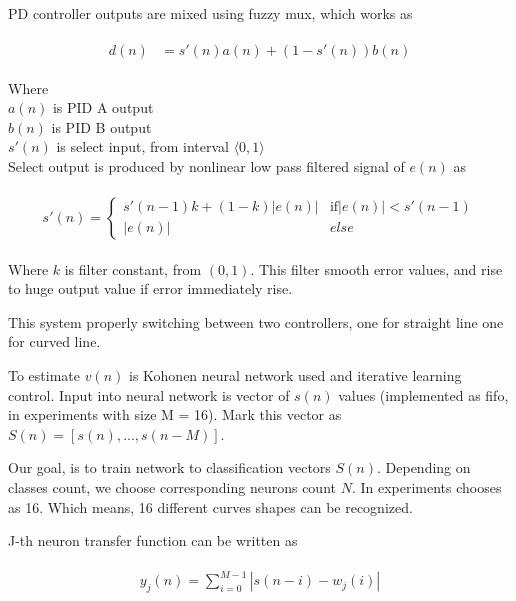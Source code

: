 \documentclass[twoside]{oss-conf-eng}
\begin{document}
PD controller outputs are mixed using fuzzy mux, which works as

\begin{eqnarray}
\begin{split}
\label{fuzzy_mux}
	d(n) &= s'(n)a(n) + (1 - s'(n))b(n)
\end{split}
\end{eqnarray}

Where \\
$a(n)$ is PID A output \\
$b(n)$ is PID B output \\
$s'(n)$ is select input, from interval $\langle 0, 1 \rangle$ \\

Select output is produced by nonlinear low pass filtered signal of $e(n)$ as

\begin{eqnarray}
\begin{split}
\label{low_pass}
s'(n) =
  \begin{cases}
    s'(n-1)k + (1 - k)|e(n)| & \text{if} |e(n)| < s'(n-1) \\
    |e(n)| & else
  \end{cases}
\end{split}
\end{eqnarray}

Where $k$ is filter constant, from $(0, 1)$. This filter smooth error
values, and rise to huge output value if error immediately rise.

This system properly switching between two controllers, one for straight line
one for curved line.

To estimate $v(n)$ is Kohonen neural network used \cite{kohonen_neural_network}
 and iterative learning control. Input into neural network is vector of $s(n)$ values
(implemented as fifo, in experiments with size M = 16). Mark this vector as $S(n) =
[s(n), ..., s(n - M)]$.

Our goal, is to train network to classification vectors $S(n)$. Depending on classes count,
we choose corresponding neurons count $N$. In experiments chooses as 16. Which means, 16 different
curves shapes can be recognized.

J-th neuron transfer function can be written as

\begin{eqnarray}
\begin{split}
\label{neuron_transfer}
y_j(n) = \sum_{i = 0}^{M-1} {|s(n-i) - w_j(i)|}
\end{split}
\end{eqnarray}
\end{document}
